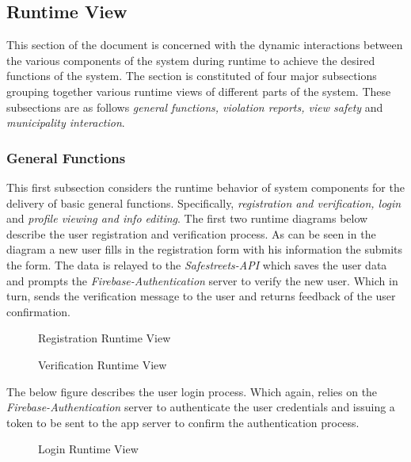 \subsection{Runtime View}
This section of the document is concerned with the dynamic interactions between the various components of the system during runtime to achieve the desired functions of the system. The section is constituted of four major subsections grouping together various runtime views of different parts of the system. These subsections are as follows \emph{general functions, violation reports, view safety} and \emph{municipality interaction}.

\subsubsection{General Functions}
This first subsection considers the runtime behavior of system components for the delivery of basic general functions. Specifically, \emph{registration and verification, login} and \emph{profile viewing and info editing}. The first two runtime diagrams below describe the user registration and verification process. As can be seen in the diagram a new user fills in the registration form with his information the submits the form. The data is relayed to the \emph{Safestreets-API} which saves the user data and prompts the \emph{Firebase-Authentication} server to verify the new user. Which in turn, sends the verification message to the user and returns feedback of the user confirmation.

\begin{figure}[H]
\caption{Registration Runtime View}
\label{fig:RuntimeReg}
\centering

\end{figure}

\begin{figure}[H]
\caption{Verification Runtime View}
\label{fig:RuntimeVer}
\centering

\end{figure}

The below figure describes the user login process. Which again, relies on the \emph{Firebase-Authentication} server to authenticate the user credentials and issuing a token to be sent to the app server to confirm the authentication process.

\begin{figure}[H]
\caption{Login Runtime View}
\label{fig:RuntimeLog}
\centering

\end{figure}

